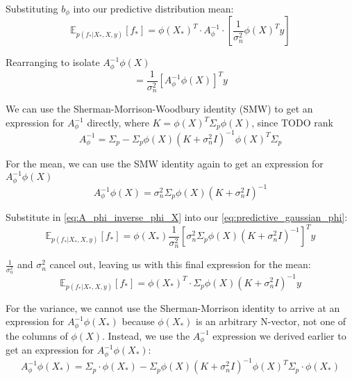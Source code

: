 Substituting $b_{\phi}$ into our predictive distribution mean:
\begin{equation*}
    \mathbb{E}_{p(f_*|X_*,X,y)}[f_*] = \phi(X_*)^T \cdot A_\phi^{-1} \cdot \left[\frac{1}{\sigma_n^2}\phi(X)^Ty\right]
\end{equation*}

Rearranging to isolate $A_\phi^{-1}\phi(X)$
\begin{equation*}
    = \frac{1}{\sigma_n^2}\left[A_{\phi}^{-1}\phi(X)\right]^Ty
\end{equation*}

We can use the Sherman-Morrison-Woodbury identity (SMW) to get an expression for $A_{\phi}^{-1}$ directly, where $K =\phi(X)^T\Sigma_p\phi(X)$, since TODO rank
\begin{equation*}
    A_{\phi}^{-1} = \Sigma_p - \Sigma_p\phi(X)(K+\sigma_n^2I)^{-1}\phi(X)^T\Sigma_p
\end{equation*}

For the mean, we can use the SMW identity again to get an expression for $A_{\phi}^{-1}\phi(X)$
\begin{equation} \label{eq:A_phi_inverse_phi_X}
    A_{\phi}^{-1}\phi(X) = \sigma_n^2\Sigma_p\phi(X)(K+\sigma_n^2I)^{-1}
\end{equation}

Substitute in \ref{eq:A_phi_inverse_phi_X} into our \ref{eq:predictive_gaussian_phi}:
\begin{equation*}
    \mathbb{E}_{p(f_*|X_*,X,y)}[f_*] = \phi(X_*) \frac{1}{\sigma_n^2}\left[\sigma_n^2\Sigma_p\phi(X)(K+\sigma_n^2I)^{-1}\right]^Ty
\end{equation*}

$\frac{1}{\sigma_n^2}$ and $\sigma_n^2$ cancel out, leaving us with this final expression for the mean:
\begin{equation} \label{eq:alt_predictive_mean_phi}
    \mathbb{E}_{p(f_*|X_*,X,y)}[f_*] = \phi(X_*)^T \cdot \Sigma_p\phi(X)(K+\sigma_n^2I)^{-1}y
\end{equation}

For the variance, we cannot use the Sherman-Morrison identity to arrive at an expression for $A_{\phi}^{-1}\phi(X_*)$ because $\phi(X_*)$ is an arbitrary N-vector, not one of the columns of $\phi(X)$. Instead, we use the $A_{\phi}^{-1}$ expression we derived earlier to get an expression for $A_{\phi}^{-1}\phi(X_*)$:
\begin{equation*}
    A_{\phi}^{-1}\phi(X_*) = \Sigma_p \cdot \phi(X_*) - \Sigma_p\phi(X)(K+\sigma_n^2I)^{-1}\phi(X)^T\Sigma_p \cdot \phi(X_*)
\end{equation*}

